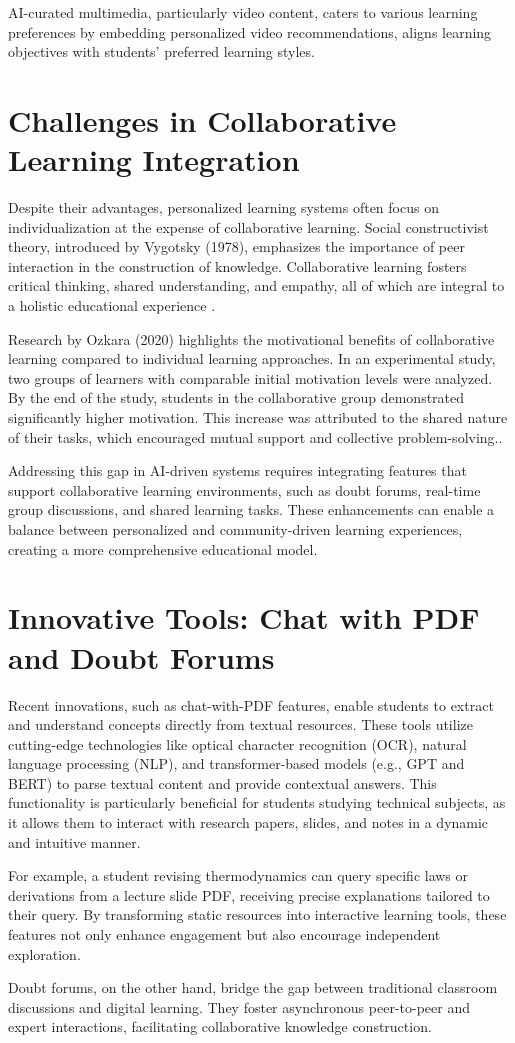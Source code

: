 AI-curated multimedia, particularly video content, caters to various learning preferences by embedding personalized video recommendations, aligns learning objectives with students' preferred learning styles.

\section{Challenges in Collaborative Learning Integration}
Despite their advantages, personalized learning systems often focus on individualization at the expense of collaborative learning. Social constructivist theory, introduced by Vygotsky (1978), emphasizes the importance of peer interaction in the construction of knowledge. Collaborative learning fosters critical thinking, shared understanding, and empathy, all of which are integral to a holistic educational experience \cite{vygotsky1978}.

Research by Ozkara (2020) highlights the motivational benefits of collaborative learning compared to individual learning approaches. In an experimental study, two groups of learners with comparable initial motivation levels were analyzed. By the end of the study, students in the collaborative group demonstrated significantly higher motivation. This increase was attributed to the shared nature of their tasks, which encouraged mutual support and collective problem-solving.\cite{betul2020}. 

Addressing this gap in AI-driven systems requires integrating features that support collaborative learning environments, such as doubt forums, real-time group discussions, and shared learning tasks. These enhancements can enable a balance between personalized and community-driven learning experiences, creating a more comprehensive educational model.

\section{Innovative Tools: Chat with PDF and Doubt Forums}
Recent innovations, such as chat-with-PDF features, enable students to extract and understand concepts directly from textual resources. These tools utilize cutting-edge technologies like optical character recognition (OCR), natural language processing (NLP), and transformer-based models (e.g., GPT and BERT) to parse textual content and provide contextual answers. This functionality is particularly beneficial for students studying technical subjects, as it allows them to interact with research papers, slides, and notes in a dynamic and intuitive manner.

For example, a student revising thermodynamics can query specific laws or derivations from a lecture slide PDF, receiving precise explanations tailored to their query. By transforming static resources into interactive learning tools, these features not only enhance engagement but also encourage independent exploration.

Doubt forums, on the other hand, bridge the gap between traditional classroom discussions and digital learning. They foster asynchronous peer-to-peer and expert interactions, facilitating collaborative knowledge construction.